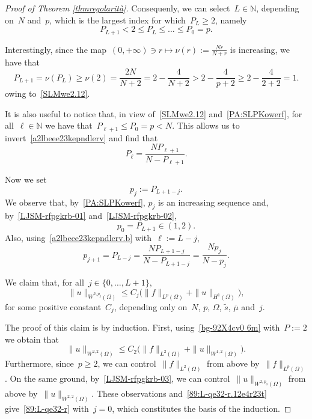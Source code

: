 \documentclass[12pt,a4paper,intlimits,sumlimits]{amsart}
\def \N {\mathbb{N}}
\theoremstyle{definition}
\theoremstyle{plain}
\numberwithin{equation}{section}
\renewcommand{\leq}{\leqslant}
\renewcommand{\le}{\leqslant}
\renewcommand{\ge}{\geqslant}
\begin{document}
\begin{proof}[Proof of Theorem \ref{thmregolarità}]
Consequenly, we can select~$L\in\N$, depending on~$N$ and~$p$,
which is the largest index for which~$P_{L}\ge2$, namely
\begin{equation}\label{LJSM-rfpgkrb-01}
P_{L+1}<2\le P_{L}\le\dots\le P_0=p.\end{equation}

Interestingly, since the map~$(0,+\infty)\ni r\mapsto\nu(r):= \frac{Nr}{N+r}$
is increasing, we have that
\begin{equation}\label{LJSM-rfpgkrb-02}
P_{L+1}=\nu(P_L)\ge \nu(2)=\frac{2N}{N+2}=
2-\frac{4}{N+2}>2-\frac{4}{p+2}\ge2-\frac{4}{2+2}=1.
\end{equation}
owing to~\eqref{SLMwe2.12}.

It is also useful to notice that, in view of~\eqref{SLMwe2.12} and~\eqref{PA:SLPKowerf}, for all~$\ell\in\N$ we have that~$P_{\ell+1}\le
P_0=p<N$. This allows us to invert~\eqref{a2lbeee23kepndlerv} and find that
\begin{equation}\label{a2lbeee23kepndlerv.b}
P_{\ell}=\frac{N P_{\ell+1}}{N-P_{\ell+1}}.\end{equation}

Now we set$$p_j:=P_{L+1-j}.$$ We observe that, by~\eqref{PA:SLPKowerf},
$p_j$ is an increasing sequence
and, by~\eqref{LJSM-rfpgkrb-01} and~\eqref{LJSM-rfpgkrb-02},
\begin{equation}\label{LJSM-rfpgkrb-03}p_0=P_{L+1}\in(1,2).\end{equation}
Also, using~\eqref{a2lbeee23kepndlerv.b} with~$\ell:=L-j$,
\begin{equation}\label{LJSM-rfpgkrb-03.12e023}
p_{j+1}=P_{L-j}=\frac{N P_{L+1-j}}{N-P_{L+1-j}}=\frac{N p_j}{N-p_j}.
\end{equation}

We claim that, for all~$j\in\{0,\dots,L+1\}$,
\begin{equation}\label{89:L-qe32-r}
\|u\|_{W^{2,p_j}(\Omega)}\leq C_j\Big(
\|f\|_{L^p(\Omega)}+\|u\|_{H^1(\Omega)}\Big),
\end{equation}
for some positive constant~$C_j$, depending only on~$N$, $p$, $\Omega$,
$\widetilde s$, $\overline\mu$ and~$j$.

The proof of this claim is by induction. \label{APKsqwfe-r8ngtoglk4}
First, using~\eqref{bg-92X4cv0 6m}
with~$P:=2$ we obtain that
\begin{equation}\label{89:L-qe32-r.12e4r23t}\|u\|_{W^{2,2}(\Omega)}\leq C_2\Big(
\|f\|_{L^2(\Omega)}+\|u\|_{W^{1,2}(\Omega)}\Big).\end{equation}
Furthermore, since~$p\ge2$, we can control~$\|f\|_{L^2(\Omega)}$ from above
by~$\|f\|_{L^p(\Omega)}$. On the same ground, by~\eqref{LJSM-rfpgkrb-03},
we can control~$\|u\|_{W^{2,p_0}(\Omega)}$ from above
by~$\|u\|_{W^{2,2}(\Omega)}$. These observations and~\eqref{89:L-qe32-r.12e4r23t}
give~\eqref{89:L-qe32-r} with~$j=0$, which constitutes the basis of the induction.
 

\end{proof}
\end{document}
